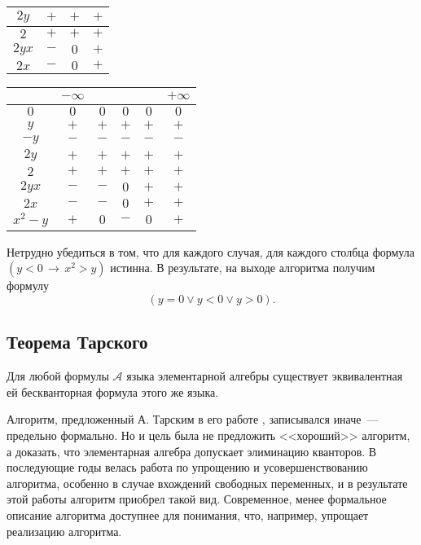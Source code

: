 \begin{enumerate}
\begin{center}
\begin{tabular}{|c|c|c|c|}
            \hline
            $2y$ & $+$ & $+$ & $+$\\
            \hline
            $2$ & $+$ & $+$ & $+$\\
            \hline
            $2yx$ & $-$ & $0$ & $+$\\
            \hline
            $2x$ & $-$ & $0$ & $+$\\
            \hline
        \end{tabular} 
            \quad 
        \begin{tabular}{|c|c|c|c|c|c|}
            \hline
             & $-\infty$ & & & & $+\infty$\\
            \hline
            $0$ & $0$ & $0$ & $0$ & $0$ & $0$\\
            \hline
            $y$ & $+$ & $+$ & $+$ & $+$ & $+$\\
            \hline
            $-y$ & $-$ & $-$ & $-$ & $-$ & $-$\\
            \hline
            $2y$ & $+$ & $+$ & $+$ & $+$ & $+$\\
            \hline
            $2$ & $+$ & $+$ & $+$ & $+$ & $+$\\
            \hline
            $2yx$ & $-$ & $-$ & $0$ & $+$ & $+$\\
            \hline
            $2x$ & $-$ & $-$ & $0$ & $+$ & $+$\\
            \hline
            $x^2 - y$ & $+$ & $0$ & $-$ & $0$ & $+$\\
            \hline
        \end{tabular} 
            \quad       
    \end{center}
\end{enumerate}
Нетрудно убедиться в том, что для каждого случая, для каждого столбца формула $(y < 0 \, \to \, x^2 > y)$ истинна. В результате, на выходе алгоритма получим формулу
\begin{equation*}
    (y = 0 \lor y < 0 \lor y > 0).
\end{equation*}

\subsection{Теорема Тарского}

\begin{theorem}
    Для любой формулы $\mathcal{A}$ языка элементарной алгебры существует эквивалентная ей бескванторная формула этого же языка.
\end{theorem}


Алгоритм, предложенный А. Тарским в его работе \cite{Tarski}, записывался иначе~--- предельно формально. Но и цель была не предложить <<хороший>> алгоритм, а доказать, что элементарная алгебра допускает элиминацию кванторов. В последующие годы велась работа по упрощению и усовершенствованию алгоритма, особенно в случае вхождений свободных переменных, и в результате этой работы алгоритм приобрел такой вид. Современное, менее формальное описание алгоритма доступнее для понимания, что, например, упрощает реализацию алгоритма.